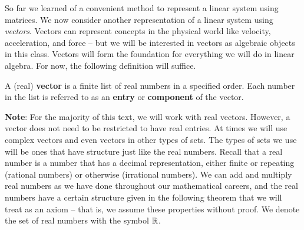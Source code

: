 
So far we learned of a convenient method to represent a linear system using matrices. We now consider another representation of a linear system using \emph{vectors}. Vectors can represent concepts in the physical world like velocity, acceleration, and force -- but we will be interested in vectors as algebraic objects in this class. Vectors will form the foundation for everything we will do in linear algebra. For now, the following definition will suffice.

\begin{definition} A (real) \textbf{vector} is a finite list of real numbers in a specified order. Each number in the list is referred to as an \textbf{entry} or \textbf{component} of the vector.
\end{definition}

\noindent \textbf{Note}: For the majority of this text, we will work with real vectors. However, a vector does not need to be restricted to have real entries. At times we will use complex vectors and even vectors in other types of sets. The types of sets we use will be ones that have structure just like the real numbers. Recall that a real number is a number that has a decimal representation, either finite or repeating (rational numbers) or otherwise (irrational numbers). We can add and multiply real numbers as we have done throughout our mathematical careers, and the real numbers have a certain structure given in the following theorem that we will treat as an axiom -- that is, we assume these properties without proof. We denote the set of real numbers with the symbol $\mathbb{R}$. 


